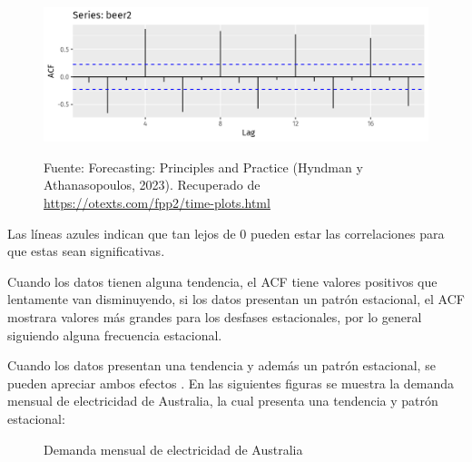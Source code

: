 \begin{itemize}
\begin{figure}[H]
        \vspace{10pt}
    
        \begin{minipage}[b]{1.1\textwidth}
            \centering
            \includegraphics[width=\textwidth]{img/produccion-cerveza-aust-ACF.png}        
        \end{minipage}
    
        \begin{minipage}[t]{0.9\textwidth}
            Fuente: Forecasting: Principles and Practice (Hyndman y Athanasopoulos, 2023). Recuperado de \url{https://otexts.com/fpp2/time-plots.html}
        \end{minipage}
    \end{figure}

    Las líneas azules indican que tan lejos de 0 pueden estar las correlaciones para que estas sean significativas. 
    
    Cuando los datos tienen alguna tendencia, el ACF tiene valores positivos que lentamente van disminuyendo, si los datos presentan un patrón estacional, el ACF mostrara valores más grandes para los desfases estacionales, por lo general siguiendo alguna frecuencia estacional.
    
    Cuando los datos presentan una tendencia y además un patrón estacional, se pueden apreciar ambos efectos \cite{forecast-time-series-arima}. En las siguientes figuras se muestra la demanda mensual de electricidad de Australia, la cual presenta una tendencia y patrón estacional:

    \begin{figure}[H]
        \begin{minipage}[t]{0.9\textwidth}
            \caption{Demanda mensual de electricidad de Australia}
            \label{autocorrelaciones3}        
        \end{minipage}
    
        \vspace{10pt}
    

\end{figure}
\end{itemize}
